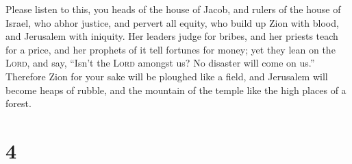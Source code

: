  Please listen to this, you heads of the house of Jacob,
and rulers of the house of Israel, who abhor justice, and pervert all
equity,  who build up Zion with blood, and Jerusalem with
iniquity.  Her leaders judge for bribes, and her priests
teach for a price, and her prophets of it tell fortunes for money; yet
they lean on the \textsc{Lord}, and say, ``Isn't the \textsc{Lord}
amongst us? No disaster will come on us.''  Therefore
Zion for your sake will be ploughed like a field, and Jerusalem will
become heaps of rubble, and the mountain of the temple like the high
places of a forest.

\hypertarget{section-3}{%
\section{4}\label{section-3}}

